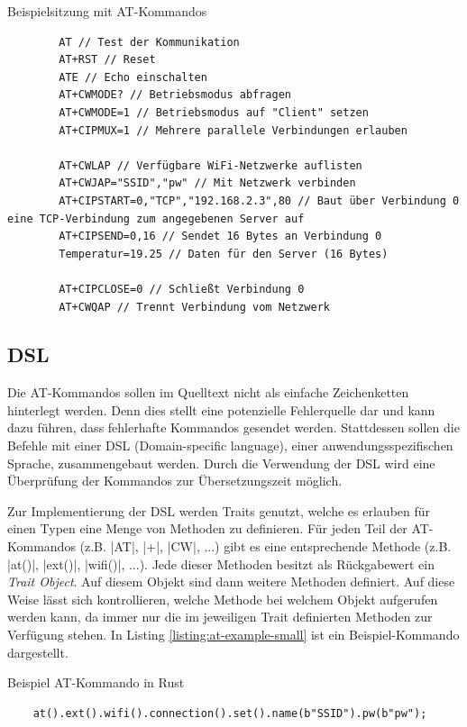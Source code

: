 \documentclass
[ 12pt,
  parskip=half %
]{scrreprt}
\newenvironment{mylisting}[1][H]
{\captionsetup{aboveskip=-0.2\normalbaselineskip}\begin{listing}[#1]}
{\end{listing}}
\begin{document}
\begin{mylisting}
	\caption{Beispielsitzung mit AT-Kommandos}
	\label{listing:at-example}
	\begin{verbatim}
		AT // Test der Kommunikation
		AT+RST // Reset
		ATE // Echo einschalten
		AT+CWMODE? // Betriebsmodus abfragen
		AT+CWMODE=1 // Betriebsmodus auf "Client" setzen
		AT+CIPMUX=1 // Mehrere parallele Verbindungen erlauben
		
		AT+CWLAP // Verfügbare WiFi-Netzwerke auflisten
		AT+CWJAP="SSID","pw" // Mit Netzwerk verbinden
		AT+CIPSTART=0,"TCP","192.168.2.3",80 // Baut über Verbindung 0 eine TCP-Verbindung zum angegebenen Server auf
		AT+CIPSEND=0,16 // Sendet 16 Bytes an Verbindung 0
		Temperatur=19.25 // Daten für den Server (16 Bytes)
		
		AT+CIPCLOSE=0 // Schließt Verbindung 0
		AT+CWQAP // Trennt Verbindung vom Netzwerk
	\end{verbatim}
\end{mylisting} 

\newpage
\subsection{DSL}
\label{sec:dsl}

Die AT-Kommandos sollen im Quelltext nicht als einfache Zeichenketten hinterlegt werden. Denn dies stellt eine potenzielle Fehlerquelle dar und kann dazu führen, dass fehlerhafte Kommandos gesendet werden. Stattdessen sollen die Befehle mit einer DSL (Domain-specific language), einer anwendungsspezifischen Sprache, zusammengebaut werden. Durch die Verwendung der DSL wird eine Überprüfung der Kommandos zur Übersetzungszeit möglich.

Zur Implementierung der DSL werden Traits genutzt, welche es erlauben für einen Typen eine Menge von Methoden zu definieren. Für jeden Teil der AT-Kommandos (z.B. \textinline|AT|, \textinline|+|, \textinline|CW|, ...) gibt es eine entsprechende Methode (z.B. \rustinline|at()|, \rustinline|ext()|, \rustinline|wifi()|, ...). Jede dieser Methoden besitzt als Rückgabewert ein \textit{Trait Object}. Auf diesem Objekt sind dann weitere Methoden definiert. Auf diese Weise lässt sich kontrollieren, welche Methode bei welchem Objekt aufgerufen werden kann, da immer nur die im jeweiligen Trait definierten Methoden zur Verfügung stehen. In Listing \ref{listing:at-example-small} ist ein Beispiel-Kommando dargestellt.

\begin{mylisting}
	\caption{Beispiel AT-Kommando in Rust}
	\label{listing:at-example-small}
	\begin{verbatim}
	at().ext().wifi().connection().set().name(b"SSID").pw(b"pw");
	\end{verbatim}
\end{mylisting} 
\end{document}
